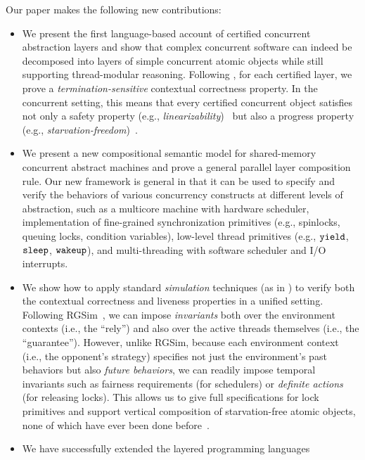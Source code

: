{Our paper makes the following new contributions:
\begin{itemize} \itemsep 0pt
\item We present the first language-based account of certified
  concurrent abstraction layers and show that complex concurrent
  software can indeed be decomposed into layers of simple concurrent
  atomic objects while still supporting thread-modular reasoning.
  Following \citet{dscal15}, for each certified layer, we prove a {\em
    termination-sensitive} contextual correctness property. In the
  concurrent setting, this means that every certified concurrent
  object satisfies not only a safety property (e.g., {\em
    linearizability})~\cite{herlihy90,filipovic10} but also a
  progress property (e.g., {\em
    starvation-freedom})~\cite{liang13,lili16}.
\item We present a new compositional semantic model for shared-memory
  concurrent abstract machines and prove a general parallel layer
  composition rule. Our new framework is general in that it can be
  used to specify and verify the behaviors of various concurrency
  constructs at different levels of abstraction, such as a multicore
  machine with hardware scheduler, implementation of fine-grained
  synchronization primitives (e.g., spinlocks, queuing locks,
  condition variables), low-level thread primitives (e.g., ${\texttt{yield}}$,
  ${\texttt{sleep}}$, ${\texttt{wakeup}}$), and multi-threading with software scheduler and I/O
  interrupts.
\item We show how to apply standard {\em simulation} techniques
  (as in \cite{compcert,dscal15}) to verify
  both the contextual correctness and liveness properties in a unified setting.
  Following RGSim~\cite{RGSim}, we can impose
  {\em invariants} both over the environment contexts (i.e., the ``rely'')
  and also over the active threads themselves (i.e., the ``guarantee'').
  However, unlike RGSim,
  because each environment context (i.e., the opponent's strategy)
  specifies not just the environment's past behaviors
  but also {\em future behaviors}, we can readily impose temporal
  invariants such as fairness requirements (for schedulers) or
  {\em definite actions}~\cite{lili16} (for releasing locks). This allows
  us to give full specifications for lock primitives and support vertical
  composition of starvation-free atomic objects, none of which have ever
  been done before~\cite{lili16}.
\item We have successfully extended the layered programming languages

\end{itemize}}
